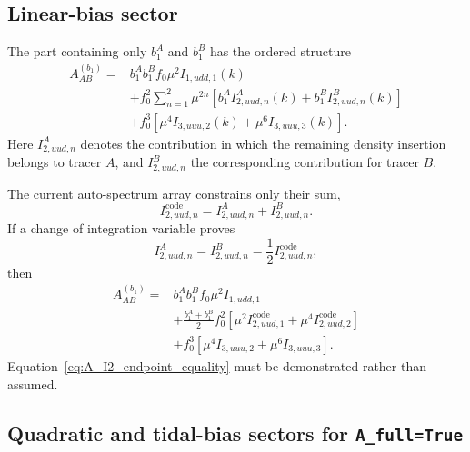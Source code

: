 \documentclass[11pt,a4paper]{article}
\begin{document}
\subsection{Linear-bias sector}

The part containing only $b_1^A$ and $b_1^B$ has the ordered structure
\begin{align}
    A_{AB}^{(b_1)}
    ={}&
    b_1^A b_1^B f_0\mu^2 I_{1,udd,1}(k)
    \nonumber\\
    &+f_0^2\sum_{n=1}^{2}\mu^{2n}
    \left[
        b_1^A I_{2,uud,n}^{A}(k)
        +b_1^B I_{2,uud,n}^{B}(k)
    \right]
    \nonumber\\
    &+f_0^3
    \left[
        \mu^4 I_{3,uuu,2}(k)
        +\mu^6 I_{3,uuu,3}(k)
    \right].
\label{eq:A_cross_b1_ordered}
\end{align}
Here $I_{2,uud,n}^{A}$ denotes the contribution in which the remaining density insertion belongs to tracer $A$, and $I_{2,uud,n}^{B}$ the corresponding contribution for tracer $B$.

The current auto-spectrum array constrains only their sum,
\begin{equation}
    I_{2,uud,n}^{\mathrm{code}}
    =I_{2,uud,n}^{A}+I_{2,uud,n}^{B}.
\label{eq:A_I2_code_sum}
\end{equation}
If a change of integration variable proves
\begin{equation}
    I_{2,uud,n}^{A}=I_{2,uud,n}^{B}
    =\frac{1}{2}I_{2,uud,n}^{\mathrm{code}},
\label{eq:A_I2_endpoint_equality}
\end{equation}
then
\begin{align}
    A_{AB}^{(b_1)}
    ={}&
    b_1^A b_1^B f_0\mu^2 I_{1,udd,1}
    \nonumber\\
    &+\frac{b_1^A+b_1^B}{2}f_0^2
    \left[
        \mu^2 I_{2,uud,1}^{\mathrm{code}}
        +\mu^4 I_{2,uud,2}^{\mathrm{code}}
    \right]
    \nonumber\\
    &+f_0^3
    \left[
        \mu^4I_{3,uuu,2}
        +\mu^6I_{3,uuu,3}
    \right].
\label{eq:A_cross_b1_symmetric}
\end{align}
Equation~\eqref{eq:A_I2_endpoint_equality} must be demonstrated rather than assumed.

\subsection{Quadratic and tidal-bias sectors for \texttt{A\_full=True}}
\end{document}
